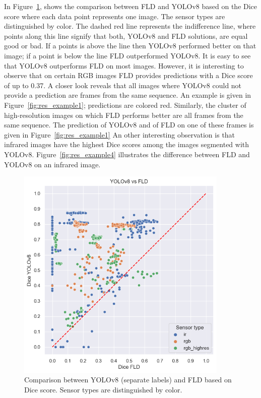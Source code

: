 \documentclass[Master,MDS,english]{BASE/twbook} %
\begin{document}
In Figure~\ref{fig:yolo_vs_fld}, shows the comparison between FLD and YOLOv8 based on the Dice score where each data point represents one image. The sensor types are distinguished by color. The dashed red line represents the indifference line, where points along this line signify that both, YOLOv8 and FLD solutions, are equal good or bad. If a points is above the line then YOLOv8 performed better on that image; if a point is below the line FLD outperformed YOLOv8. It is easy to see that YOLOv8 outperforms FLD on most images. However, it is interesting to observe that on certain RGB images FLD provides predictions with a Dice score of up to 0.37. A closer look reveals that all images where YOLOv8 could not provide a prediction are frames from the same sequence. An example is given in Figure~\ref{fig:res_example1}; predictions are colored red. Similarly, the cluster of high-resolution images on which FLD performs better are all frames from the same sequence. The prediction of YOLOv8 and of FLD on one of these frames is given in Figure~\ref{fig:res_example1}
An other interesting observation is that infrared images have the highest Dice scores among the images segmented with YOLOv8. Figure~\ref{fig:res_example4} illustrates the difference between FLD and YOLOv8 on an infrared image.



\begin{figure}[h]
\centering
\includegraphics[width=0.9\textwidth]{images/results/dice_fld_vs_yolo_nl}
\caption{Comparison between YOLOv8 (separate labels) and FLD based on Dice score. Sensor types are distinguished by color. }
\label{fig:yolo_vs_fld}
\end{figure}
\end{document}
